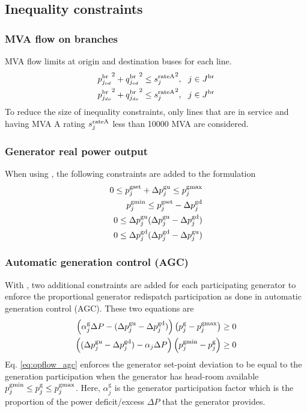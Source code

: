 \subsection{Inequality constraints}

\subsubsection{MVA flow on branches}
MVA flow limits at origin and destination buses for each line.
\begin{align}
  {p^\text{br}_{j_{od}}}^2 + {q^\text{br}_{j_{od}}}^2 \le {s^{\text{rateA}}_j}^2,~~j \in J^\text{br}\\
  {p^\text{br}_{j_{do}}}^2 + {q^\text{br}_{j_{do}}}^2 \le {s^{\text{rateA}}_j}^2,~~j \in J^\text{br}
\end{align}
To reduce the size of inequality constraints, only lines that are in service and having MVA A rating $s^{\text{rateA}}_j$ less than 10000 MVA are considered.

\subsubsection{Generator real power output}
When using \option{\opflowgensetpoint}, the following constraints are added to the formulation
\begin{align}
  0 \le p^{\text{gset}}_j + \Delta{p}^\text{gu}_j \le p^\text{gmax}_j \\
p^\text{gmin}_j \le p^{\text{gset}}_j - \Delta{p}^\text{gd}_j \\
0 \le \Delta{p}^\text{gu}_j(\Delta{p}^\text{gu}_j - \Delta{p}^\text{gd}_j) \\
0 \le \Delta{p}^\text{gd}_j(\Delta{p}^\text{gd}_j - \Delta{p}^\text{gu}_j)
\end{align}

\subsubsection{Automatic generation control (AGC)}
With \option{\opflowuseagc}, two additional constraints are added for each participating generator to enforce the proportional generator redispatch participation as done in automatic generation control (AGC). These two equations are 
\begin{equation}
\begin{aligned}
  \left(\alpha^{\text{g}}_j\Delta{P} - (\Delta{p}^\text{gu}_j - \Delta{p}^\text{gd}_j)\right)\left(p^\text{g}_j - p^\text{gmax}_j\right) \ge 0 \\
  \left((\Delta{p}^\text{gu}_j - \Delta{p}^\text{gd}_j) - \alpha_j\Delta{P}\right)\left(p^\text{gmin}_j - p^\text{g}_j\right) \ge 0
\end{aligned}
\label{eq:opflow_agc}
\end{equation}
Eq. \ref{eq:opflow_agc} enforces the generator set-point deviation to be equal to the generation participation when the generator has head-room available $p^\text{gmin}_j \le p^\text{g}_j \le p^\text{gmax}_j$. Here, $\alpha^{\text{g}}_j$ is the generator participation factor which is the proportion of the power deficit/excess $\Delta{P}$ that the generator provides.

